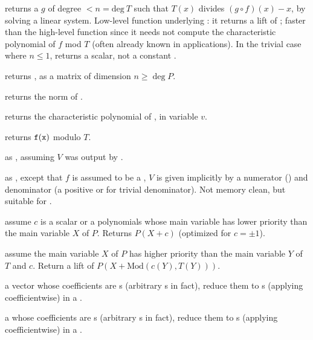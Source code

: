  returns a  $g$ of degree $< n
= \text{deg}~T$ such that $T(x)$ divides $(g \circ f)(x) - x$, by solving a
linear system. Low-level function underlying : it returns a
lift of \kbd[modreverse(f,T)]; faster than the high-level function since it
needs not compute the characteristic polynomial of $f$ mod $T$ (often already
known in applications). In the trivial case where $n \leq 1$, returns a
scalar, not a constant .

 returns
, as a matrix of dimension $n \geq \deg P$.

 returns the norm of .

 returns the characteristic
polynomial of , in variable $v$.

 returns ${\tt f}({\tt x})$ modulo
$T$.

 as ,
assuming $V$ was output by .

 as ,
except that $f$ is assumed to be a , $V$ is given implicitly
by a numerator  () and denominator  (a positive
 or  for trivial denominator). Not memory clean, but
suitable for .

 assume $c$ is a scalar or
a polynomials whose main variable has lower priority than the main variable
$X$ of $P$. Returns $P(X + c)$ (optimized for $c = \pm 1$).

 assume the main variable
$X$ of $P$ has higher priority than the main variable $Y$ of $T$ and $c$.
Return a lift of $P(X+\text{Mod}(c(Y), T(Y)))$.

  a vector whose
coefficients are s (arbitrary s in fact), reduce them to
s (applying  coefficientwise) in a .

  a  whose
coefficients are s (arbitrary s in fact), reduce them to
s (applying  coefficientwise) in a .


